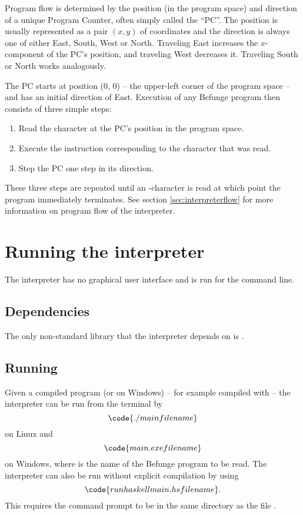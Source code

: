 \documentclass[12pt, a4paper]{article}
\begin{document}
Program flow is determined by the position (in the program space) and direction of a unique Program Counter, often simply called the “PC”. The position is usually represented as a pair $(x, y)$ of coordinates and the direction is always one of either East, South, West or North. Traveling East increases the $x$-component of the PC's position, and traveling West decreases it. Traveling South or North works analogously.

The PC starts at position (0, 0) -- the upper-left corner of the program space -- and has an initial direction of East. Execution of any Befunge program then consists of three simple steps:
\begin{enumerate}

\item Read the character at the PC's position in the program space.
\item Execute the instruction corresponding to the character that was read.
\item Step the PC one step in its direction.

\end{enumerate}
These three steps are repeated until an -character is read at which point the program immediately terminates. See section \ref{sec:interpreterflow} for more information on program flow of the interpreter.

\section{Running the interpreter}
\label{sec:howtorun}

The interpreter has no graphical user interface and is run for the command line.

\subsection{Dependencies}
\label{sec:dependencies}

The only non-standard library that the interpreter depends on is .

\subsection{Running}
\label{sec:run}

Given a compiled program  (or  on Windows) -- for example compiled with  -- the interpreter can be run from the terminal by
$$\code{./main filename}$$
on Linux and
$$\code{main.exe filename}$$
on Windows, where  is the name of the Befunge program to be read. The interpreter can also be run without explicit compilation by using
$$\code{runhaskell main.hs filename}.$$
This requires the command prompt to be in the same directory as the file .
\end{document}

